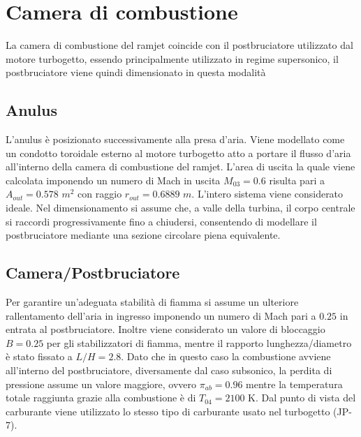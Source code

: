 

\section{Camera di combustione}
\label{sec:camera_combustione}

La camera di combustione del ramjet coincide con il postbruciatore utilizzato dal motore turbogetto, essendo principalmente utilizzato in regime supersonico, il postbruciatore viene quindi dimensionato in questa modalità

\subsection{Anulus}
 L'anulus è posizionato successivamente alla presa d'aria. Viene modellato come un condotto toroidale esterno al motore turbogetto atto a portare il flusso d'aria all'interno della camera di combustione del ramjet. L'area di uscita la quale viene calcolata imponendo un numero di Mach in uscita \(M_{03}=0.6\) risulta pari a \(A_{out}=0.578\) \(m^{2}\) con raggio \(r_{out}=0.6889\) \(m\).
L'intero sistema viene considerato ideale. Nel dimensionamento si assume che, a valle della turbina, il corpo centrale
si raccordi progressivamente fino a chiudersi, consentendo di modellare il
postbruciatore mediante una sezione circolare piena equivalente.


\subsection{Camera/Postbruciatore}
Per garantire un'adeguata stabilità di fiamma si assume un ulteriore rallentamento dell'aria in ingresso imponendo un numero di Mach pari a \(0.25\) in entrata al postbruciatore. Inoltre viene considerato un valore di bloccaggio \(B=0.25\) per gli stabilizzatori di fiamma, mentre il rapporto lunghezza/diametro è stato fissato a \(L/H=2.8\).
Dato che in questo caso la combustione avviene all'interno del postbruciatore, diversamente dal caso subsonico, la perdita di pressione assume un valore maggiore, ovvero \(\pi_{ab}=0.96\) mentre la temperatura totale raggiunta grazie alla combustione è di \(T_{04}=2100 \text{ K}\).
Dal punto di vista del carburante viene utilizzato lo stesso tipo di carburante usato nel turbogetto (JP-7).

